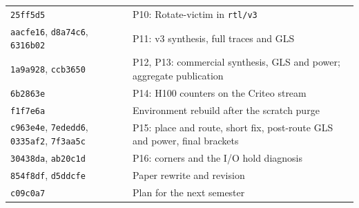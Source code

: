 \documentclass[11pt,a4paper]{report}
\begin{document}
\begin{small}
\begin{longtable}{@{}>{\raggedright\arraybackslash}p{}>{\raggedright\arraybackslash}p{}@{}}
\texttt{25ff5d5} & P10: Rotate-victim in \texttt{rtl/v3} \\
\texttt{aacfe16}, \texttt{d8a74c6}, \texttt{6316b02} & P11: v3 synthesis, full traces and GLS \\
\texttt{1a9a928}, \texttt{ccb3650} & P12, P13: commercial synthesis, GLS and power; aggregate publication \\
\texttt{6b2863e} & P14: H100 counters on the Criteo stream \\
\texttt{f1f7e6a} & Environment rebuild after the scratch purge \\
\texttt{c963e4e}, \texttt{7ededd6}, \texttt{0335af2}, \texttt{7f3aa5c} & P15: place and route, short fix, post-route
GLS and power, final brackets \\
\texttt{30438da}, \texttt{ab20c1d} & P16: corners and the I/O hold diagnosis \\
\texttt{854f8df}, \texttt{d5ddcfe} & Paper rewrite and revision \\
\texttt{c09c0a7} & Plan for the next semester \\
\bottomrule
\end{longtable}
\end{small}



\end{document}
